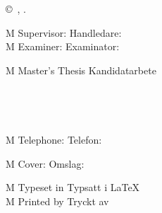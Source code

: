 { %
\newpage
\thispagestyle{empty}
\vspace*{4.5cm}
\thesisImprintTitle\\
\thesisImprintSubtitle\\
\thesisAuthor \setlength{\parskip}{1cm}

\copyright~\thesisAuthor, \thesisYear. \setlength{\parskip}{1cm}

\if\thesisType M
    Supervisor:
\else
    Handledare:
\fi
\thesisSupervisor\\
\if\thesisType M
    Examiner:
\else
    Examinator:
\fi
\thesisExaminer \setlength{\parskip}{1cm}

\if\thesisType M
    Master's Thesis
\else
    Kandidatarbete
\fi
\thesisYear\\
\thesisDepartment\\
\ifx\thesisGroup\undefined
\else
\thesisGroup\\
\fi
\thesisUniversity\\
\thesisImprintLocation\\
\if\thesisType M
    Telephone:
\else
    Telefon:
\fi
\thesisUniversityTel \setlength{\parskip}{0.5cm}

\vfill
\ifx\thesisCoverFigure\undefined
\else
    \if\thesisType M
        Cover:
    \else
        Omslag:
    \fi
    \thesisCoverFigureCaption
    \setlength{\parskip}{0.5cm}
\fi

\if\thesisType M
    Typeset in
\else
    Typsatt i
\fi
\LaTeX\\
\ifx\thesisPrintedBy\undefined
\else
    \if\thesisType M
        Printed by
    \else
        Tryckt av
    \fi
    \thesisPrintedBy\\
\fi
\thesisLocation\ \thesisYear
}
